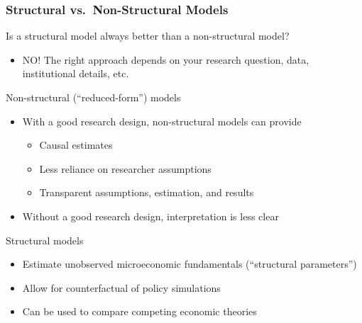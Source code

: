 \documentclass{beamer}
\begin{document}
\begin{frame}\frametitle{Structural vs.\ Non-Structural Models}
    Is a structural model always better than a non-structural model?
    \begin{itemize}
        \item NO! The right approach depends on your research question, data, institutional details, etc.
    \end{itemize}
    \vspace{1.5ex}
    Non-structural (``reduced-form'') models
    \begin{itemize}
        \item With a good research design, non-structural models can provide
        \begin{itemize}
            \item Causal estimates
            \item Less reliance on researcher assumptions
            \item Transparent assumptions, estimation, and results
        \end{itemize}
        \item Without a good research design, interpretation is less clear
    \end{itemize}
    \vspace{1.5ex}
    Structural models
    \begin{itemize}
        \item Estimate unobserved microeconomic fundamentals (``structural parameters'')
        \item Allow for counterfactual of policy simulations
        \item Can be used to compare competing economic theories
    \end{itemize}
\end{frame}
\end{document}
